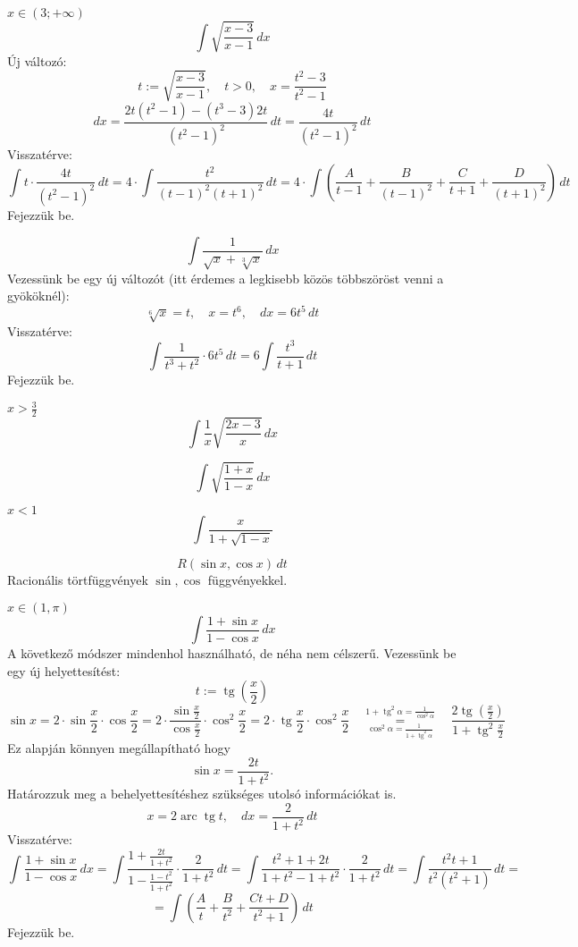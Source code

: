 \documentclass[a4paper,11.5pt]{article}
\DeclareMathOperator{\tg}{tg}
\DeclareMathOperator{\arc}{arc}
\begin{document}
	\begin{exercise}$x\in(3;+\infty)$
		\[ \int\sqrt{\frac{x-3}{x-1}}\,dx \]
		Új változó:
		\[ t:=\sqrt{\frac{x-3}{x-1}},\quad t>0,\quad x=\frac{t^2-3}{t^2-1} \]
		\[ dx=\frac{2t(t^2-1)-(t^3-3)2t}{(t^2-1)^2}\,dt=\frac{4t}{(t^2-1)^2}\,dt \]
		Visszatérve:
		\[ \int t\cdot\frac{4t}{(t^2-1)^2}\,dt=4\cdot\int\frac{t^2}{(t-1)^2(t+1)^2}\,dt=4\cdot\int\left(\frac{A}{t-1}+\frac{B}{(t-1)^2}+\frac{C}{t+1}+\frac{D}{(t+1)^2}\right)\,dt \]
		Fejezzük be.
	\end{exercise}
	\begin{exercise}
		\[ \int\frac{1}{\sqrt{x}+\sqrt[3]{x}}\,dx \]
		Vezessünk be egy új változót (itt érdemes a legkisebb közös többszöröst venni a gyököknél):
		\[ \sqrt[6]{x}=t,\quad x=t^6,\quad dx=6t^5\,dt \]
		Visszatérve:
		\[ \int\frac{1}{t^3+t^2}\cdot6t^5\,dt=6\int\frac{t^3}{t+1}\,dt \]
		Fejezzük be.
	\end{exercise}
	\begin{exercise}$x>\frac{3}{2}$
		\[ \int\frac{1}{x}\sqrt{\frac{2x-3}{x}}\,dx \]
	\end{exercise}
	\begin{exercise}
		\[ \int\sqrt{\frac{1+x}{1-x}}\,dx \]
	\end{exercise}
	\begin{exercise}$x<1$
		\[ \int\frac{x}{1+\sqrt{1-x}} \]
	\end{exercise}
	\begin{example}
		\[ R\left(\sin x,\cos x\right)\,dt \]
		Racionális törtfüggvények $\sin, \cos$ függvényekkel.
	\end{example}
	\begin{exercise}$x\in\left(1,\pi\right)$
		\[ \int\frac{1+\sin x}{1-\cos x}\,dx \]
		A következő módszer mindenhol használható, de néha nem célszerű. Vezessünk be egy új helyettesítést:
		\[  t:=\tg \left(\frac{x}{2}\right) \]
		\[ \sin x=2\cdot\sin\frac{x}{2}\cdot\cos\frac{x}{2}=2\cdot\frac{\sin\frac{x}{2}}{\cos\frac{x}{2}}\cdot\cos^2\frac{x}{2}=2\cdot\tg\frac{x}{2}\cdot\cos^2\frac{x}{2}\quad \overset{1+\tg^2\alpha=\frac{1}{\cos^2\alpha}}{\underset{\cos^2\alpha=\frac{1}{1+\tg^2\alpha}}{=}}\quad \frac{2\tg\left(\frac{x}{2}\right)}{1+\tg^2\frac{x}{2}} \]
		Ez alapján könnyen megállapítható hogy
		\[ \sin x=\frac{2t}{1+t^2}. \]
		Határozzuk meg a behelyettesítéshez szükséges utolsó információkat is.
		\[ x=2\arc\tg t,\quad dx=\frac{2}{1+t^2}\,dt \]
		Visszatérve:
		\[ \int\frac{1+\sin x}{1-\cos x}\,dx=\int\frac{1+\frac{2t}{1+t^2}}{1-\frac{1-t^2}{1+t^2}}\cdot\frac{2}{1+t^2}\,dt=\int\frac{t^2+1+2t}{1+t^2-1+t^2}\cdot\frac{2}{1+t^2}\,dt=\int\frac{t^2t+1}{t^2(t^2+1)}\,dt=\]
		\[=\int\left(\frac{A}{t}+\frac{B}{t^2}+\frac{Ct+D}{t^2+1}\right)\,dt  \] 
		Fejezzük be.
	\end{exercise}
\end{document}
